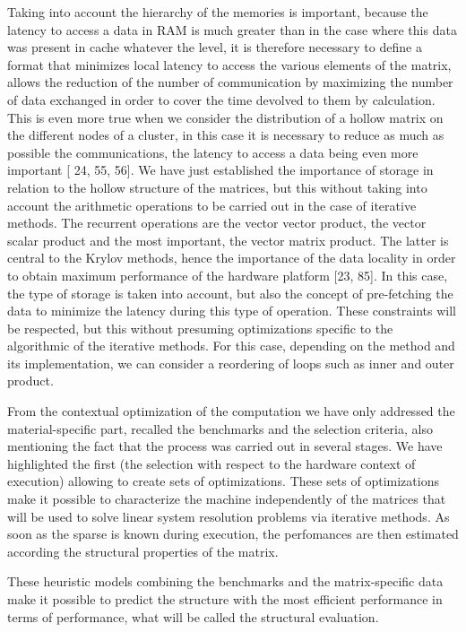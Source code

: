 \begin{enumerate}
Taking into account the hierarchy of the memories is important, because the latency to access a data in RAM is much greater than in the case where this data was present in cache whatever the level, it is therefore necessary to define a format that minimizes local latency to access the various elements of the matrix, allows the reduction of the number of communication by maximizing the number of data exchanged in order to cover the time devolved to them by calculation. This is even more true when we consider the distribution of a hollow matrix on the different nodes of a cluster, in this case it is necessary to reduce as much as possible the communications, the latency to access a data being even more important [ 24, 55, 56].
We have just established the importance of storage in relation to the hollow structure of the matrices, but this without taking into account the arithmetic operations to be carried out in the case of iterative methods. The recurrent operations are the vector vector product, the vector scalar product and the most important, the vector matrix product. The latter is central to the Krylov methods, hence the importance of the data locality in order to obtain maximum performance of the hardware platform [23, 85]. In this case, the type of storage is taken into account, but also the concept of pre-fetching the data to minimize the latency during this type of operation. These constraints will be respected, but this without presuming optimizations specific to the algorithmic of the iterative methods. For this case, depending on the method and its implementation, we can consider a reordering of loops such as inner and outer product.

From the contextual optimization of the computation we have only addressed the material-specific part, recalled the benchmarks and the selection criteria, also mentioning the fact that the process was carried out in several stages. We have highlighted the first (the selection with respect to the hardware context of execution) allowing to create sets of optimizations. These sets of optimizations make it possible to characterize the machine independently of the matrices that will be used to solve linear system resolution problems via iterative methods. As soon as the sparse is known during execution, the perfomances are then estimated according the structural properties of the matrix.

These heuristic models combining the benchmarks and the matrix-specific data make it possible to predict the structure with the most efficient performance in terms of performance, what will be called the structural evaluation.

\end{enumerate}


